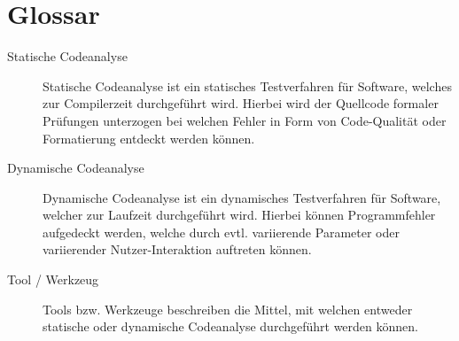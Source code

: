 \section{Glossar}
\begin{description}
	\item[Statische Codeanalyse]
	Statische Codeanalyse ist ein statisches Testverfahren für Software, welches zur Compilerzeit durchgeführt wird. Hierbei wird der Quellcode formaler Prüfungen unterzogen bei welchen Fehler in Form von Code-Qualität oder Formatierung entdeckt werden können.
		
	\item[Dynamische Codeanalyse]
	Dynamische Codeanalyse ist ein dynamisches Testverfahren für Software, welcher zur Laufzeit durchgeführt wird. Hierbei können Programmfehler aufgedeckt werden, welche durch evtl. variierende Parameter oder variierender Nutzer-Interaktion auftreten können.
		
	\item[Tool / Werkzeug]
	Tools bzw. Werkzeuge beschreiben die Mittel,  mit welchen entweder statische oder dynamische Codeanalyse durchgeführt werden können.
\end{description}